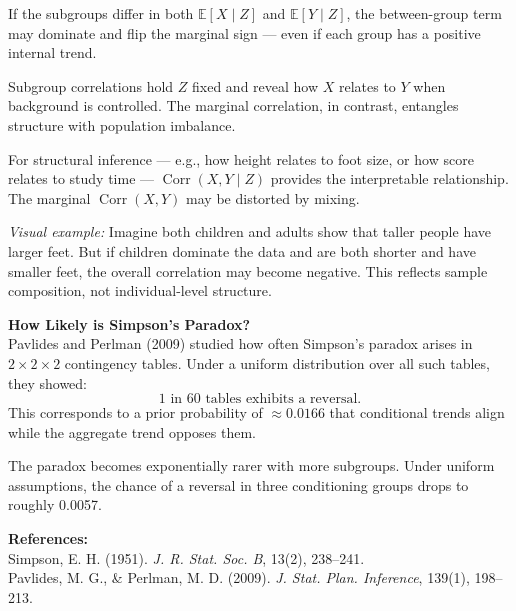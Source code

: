 \begin{technical}
If the subgroups differ in both \( \mathbb{E}[X \mid Z] \) and \( \mathbb{E}[Y \mid Z] \), the between-group term may dominate and flip the marginal sign — even if each group has a positive internal trend.

Subgroup correlations hold \( Z \) fixed and reveal how \( X \) relates to \( Y \) when background is controlled. The marginal correlation, in contrast, entangles structure with population imbalance.

For structural inference — e.g., how height relates to foot size, or how score relates to study time — \( \operatorname{Corr}(X, Y \mid Z) \) provides the interpretable relationship. The marginal \( \operatorname{Corr}(X, Y) \) may be distorted by mixing.

\vspace{0.5em}
\noindent\textit{Visual example:} Imagine both children and adults show that taller people have larger feet. But if children dominate the data and are both shorter and have smaller feet, the overall correlation may become negative. This reflects sample composition, not individual-level structure.

\vspace{1em}
\noindent\textbf{How Likely is Simpson’s Paradox?}\\[0.5em]
Pavlides and Perlman (2009) studied how often Simpson’s paradox arises in \( 2 \times 2 \times 2 \) contingency tables. Under a uniform distribution over all such tables, they showed:
\[
\boxed{\text{1 in 60 tables exhibits a reversal.}}
\]
This corresponds to a prior probability of \( \approx 0.0166 \) that conditional trends align while the aggregate trend opposes them.

The paradox becomes exponentially rarer with more subgroups. Under uniform assumptions, the chance of a reversal in three conditioning groups drops to roughly 0.0057.

\vspace{0.5em}
\noindent\textbf{References:}\\
Simpson, E. H. (1951). \textit{J. R. Stat. Soc. B}, 13(2), 238–241.\\
Pavlides, M. G., \& Perlman, M. D. (2009). \textit{J. Stat. Plan. Inference}, 139(1), 198–213.
\end{technical}
